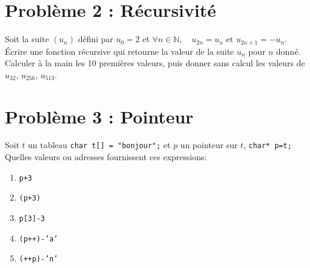 \documentclass{article}
\begin{document}
\section*{Problème 2 : Récursivité}
Soit la suite $(u_n)$ défini par $u_0=2$ et $\forall n\in \mathbb{N},\quad u_{2n} = u_n  \mbox{ et }u_{2n+1}=-u_n$. 
 Écrire une fonction récursive qui retourne la valeur de la suite $u_n$ pour $n$ donné. Calculer à la main les 10
premières valeurs, puis donner sans calcul les valeurs de $u_{32}$, $u_{256}$, $u_{513}$.

%
%
%


\section*{Problème 3 : Pointeur}
Soit $t$ un tableau {\tt char t[] = "bonjour";} et $p$ un pointeur sur $t$,  {\tt char* p=t;}
Quelles valeurs ou adresses fournissent ces expressions:
\begin{enumerate}
\item {\tt *p+3}
\item  {\tt *(p+3)}
\item {\tt p[3]-3}
\item  {\tt *(p++)-'a'}
\item  {\tt *(++p)-'n'}

\end{enumerate}
%
\end{document}
